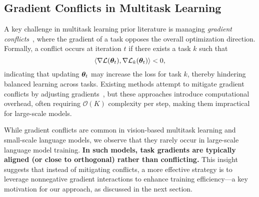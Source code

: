 %

%



%




%
%





%
%
%
%
%
%



%



%
%




%

\subsection{Gradient Conflicts in Multitask Learning}
A key challenge in multitask learning prior literature is managing \textit{gradient conflicts}~\citep{liu2021conflict, yu2020gradient}, where the gradient of a task opposes the overall optimization direction. Formally, a conflict occurs at iteration \( t \) if there exists a task \( k \) such that  
\[
\langle \nabla \mathcal{L} (\bm{\theta}_t), \nabla \mathcal{L}_k(\bm{\theta}_t) \rangle < 0,
\]
indicating that updating \( \bm{\theta}_t \) may increase the loss for task \( k \), thereby hindering balanced learning across tasks.
Existing methods attempt to mitigate gradient conflicts by adjusting gradients~\citep{yu2020gradient}, but these approaches introduce computational overhead, often requiring \(\mathcal{O}(K)\) complexity per step, making them impractical for large-scale models.  

While gradient conflicts are common in vision-based multitask learning and small-scale language models, we observe that they rarely occur in large-scale language model training. \textbf{In such models, task gradients are typically aligned (or close to orthogonal) rather than conflicting.} This insight suggests that instead of mitigating conflicts, a more effective strategy is to leverage nonnegative gradient interactions to enhance training efficiency—a key motivation for our approach, as discussed in the next section.




%

%
%
%
%
%
%
%
%

%



%
%









%
%
%
%
%
%
%
%
%

%

%



%


